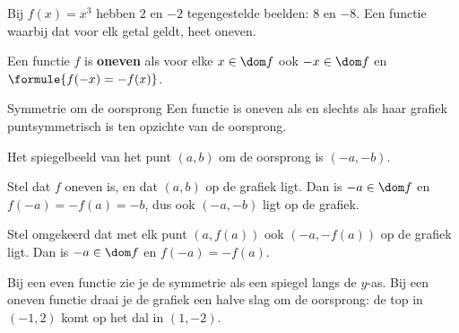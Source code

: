 Bij $f(x) = x^3$ hebben $2$ en $-2$ tegengestelde beelden: $8$ en $-8$. Een functie waarbij dat voor elk getal geldt, heet oneven.

\begin{theorie}
Een functie $f$ is \textbf{\textcolor{accent}{oneven}} als voor elke $x \in \dom f$ ook $-x \in \dom f$ en $\formule{f(-x) = -f(x)}$.

\begin{stelling}{Symmetrie om de oorsprong}
Een functie is oneven als en slechts als haar grafiek puntsymmetrisch is ten opzichte van de oorsprong.
\end{stelling}

\begin{bewijs}
Het spiegelbeeld van het punt $(a, b)$ om de oorsprong is $(-a, -b)$.

Stel dat $f$ oneven is, en dat $(a, b)$ op de grafiek ligt. Dan is $-a \in \dom f$ en $f(-a) = -f(a) = -b$, dus ook $(-a, -b)$ ligt op de grafiek.

Stel omgekeerd dat met elk punt $(a, f(a))$ ook $(-a, -f(a))$ op de grafiek ligt. Dan is $-a \in \dom f$ en $f(-a) = -f(a)$.
\end{bewijs}
\end{theorie}


Bij een even functie zie je de symmetrie als een spiegel langs de $y$-as. Bij een oneven functie draai je de grafiek een halve slag om de oorsprong: de top in $(-1, 2)$ komt op het dal in $(1, -2)$.


